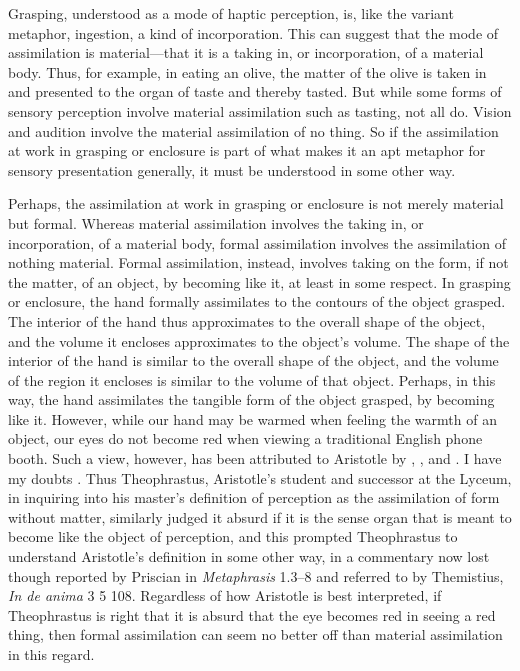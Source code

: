 Grasping, understood as a mode of haptic perception, is, like the variant meta\-phor, ingestion, a kind of incorporation. This can suggest that the mode of assimilation is material---that it is a taking in, or incorporation, of a material body. Thus, for example, in eating an olive, the matter of the olive is taken in and presented to the organ of taste and thereby tasted. But while some forms of sensory perception involve material assimilation such as tasting, not all do. Vision and audition involve the material assimilation of no thing. So if the assimilation at work in grasping or enclosure is part of what makes it an apt metaphor for sensory presentation generally, it must be understood in some other way.

Perhaps, the assimilation at work in grasping or enclosure is not merely material but formal. Whereas material assimilation involves the taking in, or incorporation, of a material body, formal assimilation involves the assimilation of nothing material. Formal assimilation, instead, involves taking on the form, if not the matter, of an object, by becoming like it, at least in some respect. In grasping or enclosure, the hand formally assimilates to the contours of the object grasped. The interior of the hand thus approximates to the overall shape of the object, and the volume it encloses approximates to the object's volume. The shape of the interior of the hand is similar to the overall shape of the object, and the volume of the region it encloses is similar to the volume of that object. Perhaps, in this way, the hand assimilates the tangible form of the object grasped, by becoming like it. However, while our hand may be warmed when feeling the warmth of an object, our eyes do not become red when viewing a traditional English phone booth. Such a view, however, has been attributed to Aristotle by \citet{Slakey:1961ss}, \citet{Sorabji:1974fk}, and \citet{Everson:1997ep}. I have my doubts \citep{Kalderon:2015fr}. Thus Theophrastus, Aristotle's student and successor at the Lyceum, in inquiring into his master's definition of perception as the assimilation of form without matter, similarly judged it absurd if it is the sense organ that is meant to become like the object of perception, and this prompted Theophrastus to understand Aristotle's definition in some other way, in a commentary now lost though reported by Priscian in \emph{Metaphrasis} 1.3–8 and referred to by Themistius, \emph{In de anima} 3 5 108. Regardless of how Aristotle is best interpreted, if Theophrastus is right that it is absurd that the eye becomes red in seeing a red thing, then formal assimilation can seem no better off than material assimilation in this regard.

